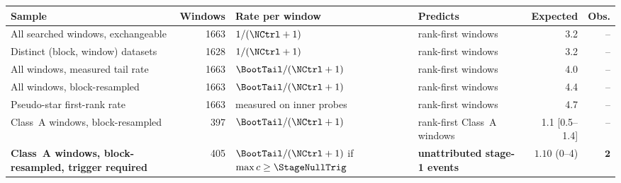 \begin{tabular}{@{}p{}rp{}p{}rr@{}}
\toprule
Sample & Windows & Rate per window & Predicts & Expected & Obs. \\
\midrule
All searched windows, exchangeable & 1663 & $1/(\NCtrl+1)$ & rank-first windows & 3.2 & -- \\
Distinct (block, window) datasets & 1628 & $1/(\NCtrl+1)$ & rank-first windows & 3.2 & -- \\
All windows, measured tail rate & 1663 & $\BootTail/(\NCtrl+1)$ & rank-first windows & 4.0 & -- \\
All windows, block-resampled & 1663 & $\BootTail/(\NCtrl+1)$ & rank-first windows & 4.4 & -- \\
Pseudo-star first-rank rate & 1663 & measured on inner probes & rank-first windows & 4.7 & -- \\
Class~A windows, block-resampled & 397 & $\BootTail/(\NCtrl+1)$ & rank-first Class~A windows & 1.1 [0.5--1.4] & -- \\
\textbf{Class~A windows, block-resampled, trigger required} & 405 & $\BootTail/(\NCtrl+1)$ if $\max c\geq\StageNullTrig$ & \textbf{unattributed stage-1 events} & $\mathbf{1.10}$ (0--4) & $\mathbf{2}$ \\
\bottomrule
\end{tabular}
